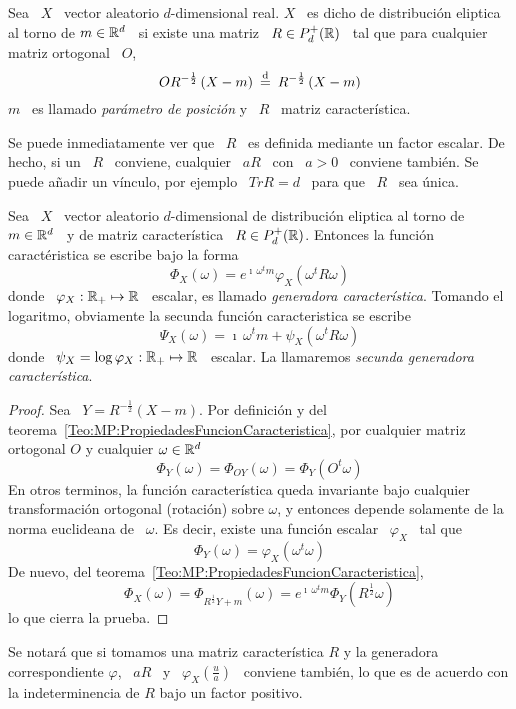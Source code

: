 

\begin{definicion}
  Sea  \  $X$  \ vector  aleatorio  $d$-dimensional  real.  $X$  \ es  dicho  de
  distribuci\'on eliptica al  torno de $m \in \mathbb{R}^d$ \ si  existe una matriz \
  $R \in P_d^+(\mathbb{R})$ \ tal que para cualquier matriz ortogonal \ $O$,
  \[
  O R^{-\frac12}  \left( X - m  \right) \: \stackrel{\mathrm{d}}{=}  \: R^{-\frac12} \left( X  - m
  \right)
  \]
  $m$  \  es  llamado  {\em  par\'ametro   de  posici\'on}  y  \  $R$  \  matriz
  caracter\'istica.
\end{definicion}
%
Se  puede  inmediatamente  ver que  \  $R$  \  es  definida mediante  un  factor
escalar. De hecho, si un  \ $R$ \ conviene, cualquier \ $a R$ \  con \ $a > 0$ \
conviene tambi\'en. Se puede  a\~nadir un v\'inculo, por ejemplo \ $Tr  R = d$ \
para que \ $R$ \ sea \'unica.

\begin{teorema}
  Sea \  $X$ \  vector aleatorio $d$-dimensional  de distribuci\'on  eliptica al
  torno  de  $m   \in  \mathbb{R}^d$  \  y  de  matriz   caracter\'istica  \  $R  \in
  P_d^+(\mathbb{R})$. Entonces la funci\'on caract\'eristica se escribe bajo la forma
  \[
  \Phi_X(\omega) = e^{\imath \, \omega^t m} \varphi_X\left( \omega^t R \omega \right)
  \]
  donde  \  $\varphi_X:  \mathbb{R}_+  \mapsto  \mathbb{R}$ \  escalar,  es  llamado  {\em
    generadora  caracter\'istica}. Tomando el  logaritmo, obviamente  la secunda
  funci\'on caracteristica se escribe
  \[
  \Psi_X(\omega) = \imath \, \omega^t m + \psi_X\left( \omega^t R \omega \right)
  \]
  donde  \  $\psi_X = \log \varphi_X:  \mathbb{R}_+  \mapsto  \mathbb{R}$ \  escalar. La llamaremos  {\em
    secunda generadora caracter\'istica}.
\end{teorema}
%
\begin{proof}
  Sea  \ $Y  =  R^{-\frac12} \left(  X -  m  \right)$.  Por  definici\'on y  del
  teorema~\ref{Teo:MP:PropiedadesFuncionCaracteristica},  por  cualquier  matriz
  ortogonal $O$ y cualquier $\omega \in \mathbb{R}^d$
  \[
  \Phi_Y(\omega) = \Phi_{O Y}(\omega) = \Phi_Y(O^t \omega)
  \]
  En  otros  terminos,  la  funci\'on  caracter\'istica  queda  invariante  bajo
  cualquier transformaci\'on  ortogonal (rotaci\'on) sobre  $\omega$, y entonces
  depende solamente de  la norma euclideana de \ $\omega$.  Es decir, existe una
  funci\'on escalar \ $\varphi_X$ \ tal que
  \[
  \Phi_Y(\omega) = \varphi_X(\omega^t \omega)
  \]
  De nuevo, del teorema~\ref{Teo:MP:PropiedadesFuncionCaracteristica},
  \[
  \Phi_X(\omega) = \Phi_{R^{\frac12}  Y + m}(\omega) = e^{\imath  \, \omega^t m}
  \Phi_Y( R^{\frac12} \omega)
  \]
  lo que cierra la prueba.
\end{proof}
%
Se  notar\'a que  si tomamos  una matriz  caracter\'istica $R$  y  la generadora
correspondiente $\varphi$, \ $a R$  \ y \ $\varphi_X\left( \frac{u}{a} \right)$ \
conviene tambi\'en, lo  que es de acuerdo con la indeterminencia  de $R$ bajo un
factor positivo.

